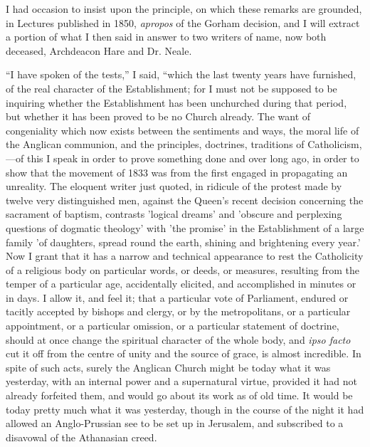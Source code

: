 I had occasion to insist upon the principle, on which these remarks
are grounded, in Lectures published in 1850, \emph{apropos} of the
Gorham decision, and I will extract a portion of what I then said in
answer to two writers of name, now both deceased, Archdeacon Hare and
Dr. Neale.

``I have spoken of the tests,'' I said, ``which the
last twenty years have furnished, of the real character of the
Establishment; for I must not be supposed to be inquiring whether the
Establishment has been unchurched during that period, but whether it
has been proved to be no Church already. The want of congeniality
which now exists between the sentiments and ways, the moral life of
the Anglican communion, and the principles, doctrines, traditions of
Catholicism,—of this I speak in order to prove something done and
over long ago, in order to show that the movement of 1833 was from the
first engaged in propagating an unreality. The eloquent writer just
quoted, in ridicule of the protest made by twelve very distinguished
men, against the Queen's recent decision concerning the sacrament of
baptism, contrasts 'logical dreams' and 'obscure and perplexing
questions of dogmatic theology' with 'the promise' in the
Establishment of a large family 'of daughters, spread round the
earth, shining and brightening every year.' Now I grant that it has a
narrow and technical appearance to rest the Catholicity of a religious
body on particular words, or deeds, or measures, resulting from the
temper of a particular age, accidentally elicited, and accomplished in
minutes or in days. I allow it, and feel it; that a particular vote of
Parliament, endured or tacitly accepted by bishops and clergy, or by
the metropolitans, or a particular appointment, or a particular
omission, or a particular statement of doctrine, should at once change
the spiritual character of the whole body, and \emph{ipso facto} cut
it off from the centre of unity and the source of grace, is almost
incredible. In spite of such acts, surely the Anglican Church might be
today what it was yesterday, with an internal power and a supernatural
virtue, provided it had not already forfeited them, and would go about
its work as of old time. It would be today pretty much what it was
yesterday, though in the course of the night it had allowed an
Anglo-Prussian see to be set up in Jerusalem, and subscribed to a
disavowal of the Athanasian creed.

